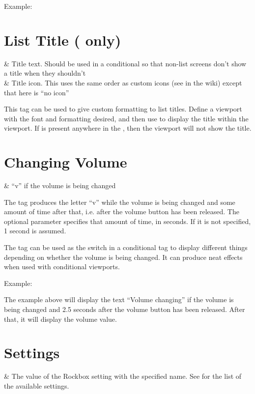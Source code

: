 Example: 

\section{List Title ( only)}
  \begin{tagmap}
     & Title text. Should be used in a conditional so that non-list
      screens don't show a title when they shouldn't\\
     & Title icon. This uses the same order as custom icons (see
       in the wiki) except that here  is ``no
      icon''\\
  \end{tagmap}

  This tag can be used to give custom formatting to list titles.
  Define a viewport with the font and formatting desired, and then use
   to display the title within the
  viewport.  If  is present anywhere in the , then the
   viewport will not show the title.

\section{Changing Volume}
  \begin{tagmap}
     & ``v'' if the volume is being changed\\
  \end{tagmap}

The tag produces the letter ``v'' while the volume is being changed and some
amount of time after that, i.e. after the volume button has been released. The
optional parameter  specifies that amount of time, in seconds. If it
is not specified, 1 second is assumed.

The tag can be used as the switch in a conditional tag to display different things
depending on whether the volume is being changed. It can produce neat effects
when used with conditional viewports.

Example: 

The example above will display the text ``Volume changing'' if the volume is
being changed and 2.5 seconds after the volume button has been released. After
that, it will display the volume value.

\section{Settings}
  \begin{tagmap}
     & The value of the Rockbox
             setting with the specified name. See 
             for the list of the available settings.\\
  \end{tagmap}


